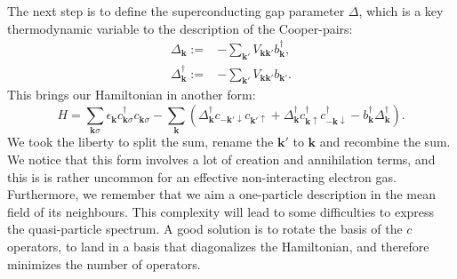 \documentclass[../main.tex]{subfile}
\begin{document}
The next step is to define the superconducting gap parameter $\Delta$, which is a key thermodynamic variable to the description of the Cooper-pairs:
\begin{align}
    \Delta_{\bm{k}} := &-\sum_{\bm{k}'} V_{\bm{k}\bm{k}'} b_{\bm{k}}^{\dagger},\\
    \Delta^{\dagger}_{\bm{k}} := &-\sum_{\bm{k}'} V_{\bm{k}\bm{k}'} b_{\bm{k}'}.\label{eq:DeltaBaseDef}
\end{align}
This brings our Hamiltonian in another form:
\begin{equation} \label{eq:HamiltonianBCS1}
    H = \sum_{\bm{k}\sigma} \epsilon_{\bm{k}} c_{\bm{k}\sigma}^{\dagger}c_{\bm{k}\sigma} - \sum_{\bm{k}} \left( \Delta_{\bm{k}}^{\dagger} c_{-\bm{k}'\downarrow}c_{\bm{k}'\uparrow}  + \Delta_{\bm{k}}^{\dagger} c_{\bm{k}\uparrow} ^{\dagger}c_{-\bm{k}\downarrow}^{\dagger} -  b_{\bm{k}}^{\dagger} \Delta_{\bm{k}}^{\dagger} \right).
\end{equation}
We took the liberty to split the sum, rename the $\bm{k}'$ to $\bm{k}$ and recombine the sum. We notice that this form involves a lot of creation and annihilation terms, and this is 
is rather uncommon for an effective non-interacting electron gas. Furthermore, we remember that we aim a one-particle description in the mean field of its neighbours.
This complexity will lead to some difficulties to express the quasi-particle spectrum. A good solution is 
to rotate the basis of the $c$ operators, to land in a basis that diagonalizes the Hamiltonian, and therefore minimizes the number of operators.\\
\end{document}
